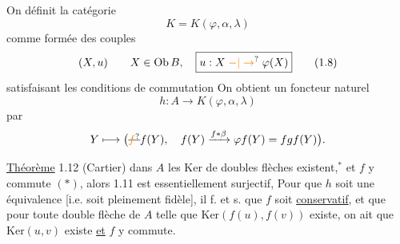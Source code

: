 On définit la catégorie
\[
 K=K(\varphi,\alpha,\lambda) \tag*{(1.7)}
\]
comme formée des couples
\[
 (X,u)\qquad X\in\mathrm{Ob}\,B,\quad \boxed{u:X\mathrel{\unsure{-|\to}}\varphi(X)} \tag*{(1.8)}
\]
satisfaisant les conditions de commutation
On obtient un foncteur naturel
\[
 \boxed{h:A\longrightarrow K(\varphi,\alpha,\lambda)} \tag*{(1.11)}
\]
par
\[
 Y\longmapsto \bigl(\deleted{\unsure{f}}f(Y),\quad f(Y)\xrightarrow{f*\beta}\varphi f(Y)=fgf(Y)\bigr).
\]

\uline{Théorème} 1.12 (Cartier)   dans $A$ les $\mathrm{Ker}$ de doubles flèches existent,$^{*}$ et   $f$ y commute $(*)$, alors 1.11 est essentiellement surjectif,
  Pour que \uline{$h$} soit une équivalence [i.e. soit  pleinement fidèle], il f. et s. que $f$ soit \uline{conservatif}, et que pour toute double flèche  de $A$ telle que $\mathrm{Ker}(f(u),f(v))$ existe, on ait que $\mathrm{Ker}(u,v)$ existe \uline{et} $f$ y commute.

